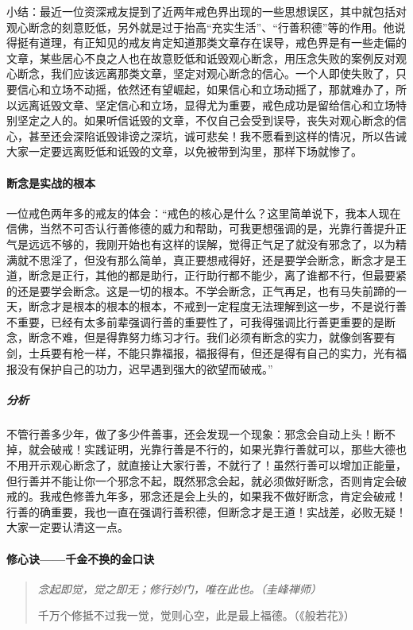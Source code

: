 小结：最近一位资深戒友提到了近两年戒色界出现的一些思想误区，其中就包括对观心断念的刻意贬低，另外就是过于抬高“充实生活”、“行善积德”等的作用。他说得挺有道理，有正知见的戒友肯定知道那类文章存在误导，戒色界是有一些走偏的文章，某些居心不良之人也在故意贬低和诋毁观心断念，用压念失败的案例反对观心断念，我们应该远离那类文章，坚定对观心断念的信心。一个人即使失败了，只要信心和立场不动摇，依然还有望崛起，如果信心和立场动摇了，那就难办了，所以远离诋毁文章、坚定信心和立场，显得尤为重要，戒色成功是留给信心和立场特别坚定之人的。如果听信诋毁的文章，不仅自己会受到误导，丧失对观心断念的信心，甚至还会深陷诋毁诽谤之深坑，诚可悲矣！我不愿看到这样的情况，所以告诫大家一定要远离贬低和诋毁的文章，以免被带到沟里，那样下场就惨了。

\paragraph{断念是实战的根本}

一位戒色两年多的戒友的体会：“戒色的核心是什么？这里简单说下，我本人现在信佛，当然不可否认行善修德的威力和帮助，可我更想强调的是，光靠行善提升正气是远远不够的，我刚开始也有这样的误解，觉得正气足了就没有邪念了，以为精满就不思淫了，但没有那么简单，真正要想戒得好，还是要学会断念，断念才是王道，断念是正行，其他的都是助行，正行助行都不能少，离了谁都不行，但最要紧的还是要学会断念。这是一切的根本。不学会断念，正气再足，也有马失前蹄的一天，断念才是根本的根本的根本，不戒到一定程度无法理解到这一步，不是说行善不重要，已经有太多前辈强调行善的重要性了，可我得强调比行善更重要的是断念，断念不难，但是得靠努力练习才行。我们必须有断念的实力，就像剑客要有剑，士兵要有枪一样，不能只靠福报，福报得有，但还是得有自己的实力，光有福报没有保护自己的功力，迟早遇到强大的欲望而破戒。”

\subparagraph{分析} 不管行善多少年，做了多少件善事，还会发现一个现象：邪念会自动上头！断不掉，就会破戒！实践证明，光靠行善是不行的，如果光靠行善就可以，那些大德也不用开示观心断念了，就直接让大家行善，不就行了！虽然行善可以增加正能量，但行善并不能让你一个邪念不起，既然邪念会起，就必须做好断念，否则肯定会破戒的。我戒色修善九年多，邪念还是会上头的，如果我不做好断念，肯定会破戒！行善的确重要，我也一直在强调行善积德，但断念才是王道！实战差，必败无疑！大家一定要认清这一点。

\paragraph{修心诀——千金不换的金口诀}

\begin{quotation}\it
    念起即觉，觉之即无；修行妙门，唯在此也。（圭峰禅师）

    千万个修抵不过我一觉，觉则心空，此是最上福德。（《般若花》）
\end{quotation}

